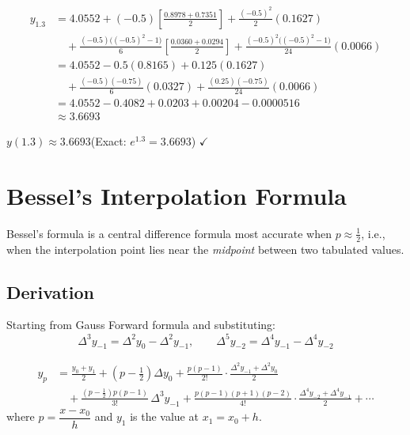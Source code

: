 \documentclass[12pt]{article}
\begin{document}
\begin{exbox}
\begin{align*}
  y_{1.3} &= 4.0552
  + (-0.5)\!\left[\frac{0.8978+0.7351}{2}\right]
  + \frac{(-0.5)^2}{2}(0.1627) \\
  &\quad + \frac{(-0.5)\bigl((-0.5)^2-1\bigr)}{6}\!\left[\frac{0.0360+0.0294}{2}\right]
  + \frac{(-0.5)^2\bigl((-0.5)^2-1\bigr)}{24}(0.0066) \\[4pt]
  &= 4.0552 - 0.5(0.8165) + 0.125(0.1627) \\
  &\quad + \frac{(-0.5)(-0.75)}{6}(0.0327) + \frac{(0.25)(-0.75)}{24}(0.0066)\\[4pt]
  &= 4.0552 - 0.4082 + 0.0203 + 0.00204 - 0.0000516\\
  &\approx \mathbf{3.6693}
\end{align*}
\end{exbox}

\begin{ansbox}
$y(1.3) \approx 3.6693$\quad (Exact: $e^{1.3} = 3.6693$) $\checkmark$
\end{ansbox}

\section{Bessel's Interpolation Formula}

\begin{defbox}
Bessel's formula is a central difference formula most accurate when $p \approx \tfrac{1}{2}$, i.e., when the interpolation point lies near the \emph{midpoint} between two tabulated values.
\end{defbox}

\subsection*{Derivation}

Starting from Gauss Forward formula and substituting:
\[
  \Delta^3 y_{-1} = \Delta^2 y_0 - \Delta^2 y_{-1}, \qquad
  \Delta^5 y_{-2} = \Delta^4 y_{-1} - \Delta^4 y_{-2}
\]

\begin{formulabox}
\begin{align*}
  y_p &= \frac{y_0+y_1}{2}
  + \!\left(p-\tfrac{1}{2}\right)\Delta y_0
  + \frac{p(p-1)}{2!}\cdot\frac{\Delta^2 y_{-1}+\Delta^2 y_0}{2} \\[4pt]
  &\quad+\frac{\left(p-\frac{1}{2}\right)p(p-1)}{3!}\,\Delta^3 y_{-1}
  + \frac{p(p-1)\!\left(p+1\right)\!\left(p-2\right)}{4!}\cdot\frac{\Delta^4 y_{-2}+\Delta^4 y_{-1}}{2}
  + \cdots
\end{align*}
where $p = \dfrac{x-x_0}{h}$ and $y_1$ is the value at $x_1 = x_0+h$.
\end{formulabox}
\end{document}
